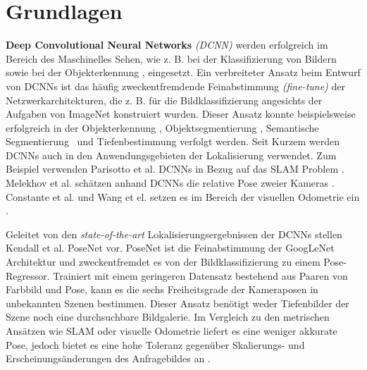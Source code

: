 \pagebreak
\section{Grundlagen}




\pagebreak
\textbf{Deep Convolutional Neural Networks} \textit{(DCNN)} werden erfolgreich im Bereich des Maschinelles Sehen, wie z. B. bei der Klassifizierung von Bildern \cite{krizhevskyImageNetClassificationDeep2012, simonyanVeryDeepConvolutional2014, heDeepResidualLearning2015} sowie bei der  Objekterkennung \cite{girshickRichFeatureHierarchies2013, renFasterRCNNRealTime2015b, girshickFastRCNN2015},  eingesetzt. 
Ein verbreiteter Ansatz beim Entwurf von DCNNs ist das häufig zweckentfremdende Feinabstimmung \textit{(fine-tune)} der Netzwerkarchitekturen, die z. B. für die Bildklassifizierung angesichts der Aufgaben von ImageNet \cite{russakovskyImageNetLargeScale2014} konstruiert wurden. Dieser Ansatz konnte beispielsweise erfolgreich in der Objekterkennung \cite{girshickFastRCNN2015}, Objektsegmentierung \cite{kokkinosPushingBoundariesBoundary2015, maninisConvolutionalOrientedBoundaries2016}, Semantische Segmentierung \cite{nohLearningDeconvolutionNetwork2015, hazirbasFuseNetIncorporatingDepth2017a} und Tiefenbestimmung \cite{liDepthSurfaceNormal2015} verfolgt werden.
Seit Kurzem werden DCNNs auch in den Anwendungsgebieten der Lokalisierung verwendet. Zum Beispiel verwenden Parisotto et al. DCNNs in Bezug auf das SLAM Problem \cite{parisottoGlobalPoseEstimation2018}. Melekhov et al. schätzen anhand DCNNs die relative Pose zweier Kameras \cite{melekhovRelativeCameraPose2017}. Constante et al. und Wang et el. setzen es im Bereich der visuellen Odometrie ein \cite{costanteExploringRepresentationLearning2016, wangDeepVOEndtoendVisual2017}.

Geleitet von den \textit{state-of-the-art} Lokalisierungsergebnissen der DCNNs stellen Kendall et al. PoseNet \cite{kendallPoseNetConvolutionalNetwork2015} vor.
PoseNet ist die Feinabstimmung der GoogLeNet \cite{szegedyGoingDeeperConvolutions2015} Architektur und zweckentfremdet es von der Bildklassifizierung zu einem Pose-Regressor. Trainiert mit einem geringeren Datensatz bestehend aus Paaren von Farbbild und Pose, kann es die sechs Freiheitsgrade der Kameraposen in unbekannten Szenen bestimmen. Dieser Ansatz benötigt weder Tiefenbilder der Szene noch eine durchsuchbare Bildgalerie. Im Vergleich zu den metrischen Ansätzen wie SLAM oder visuelle Odometrie liefert es eine weniger akkurate Pose, jedoch bietet es eine hohe Toleranz gegenüber Skalierungs- und Erscheinungsänderungen des Anfragebildes an \cite{piascoSurveyVisualBasedLocalization2018}.


